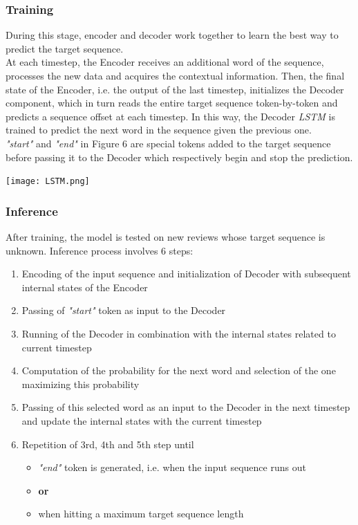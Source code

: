 \documentclass[fleqn,10pt]{SelfArx} %
\begin{document}
\subsubsection{Training}
During this stage, encoder and decoder work together to learn the best way to predict the target sequence.\\ At each timestep, the Encoder receives an additional word of the sequence, processes the new data and acquires the contextual information. Then, the final state of the Encoder, i.e. the output of the last timestep, initializes the Decoder component, which in turn reads the entire target sequence token-by-token and predicts a sequence offset at each timestep. In this way, the Decoder \textit{LSTM} is trained to predict the next word in the sequence given the previous one.\\
\textit{"start"} and \textit{"end"} in Figure 6 are special tokens added to the target sequence before passing it to the Decoder which respectively begin and stop the prediction.\par
{\centering\vspace{10pt}
\texttt{[image: LSTM.png]}
\vspace{10pt}
\par}
\subsubsection{Inference}
After training, the model is tested on new reviews whose target sequence is unknown. Inference process involves 6 steps:
\begin{enumerate}
    \item Encoding of the input sequence and initialization of Decoder with subsequent internal states of the Encoder
    \item Passing of \textit{"start"} token as input to the Decoder
    \item Running of the Decoder in combination with the internal states related to current timestep 
    \item Computation of the probability for the next word and selection of the one maximizing this probability
    \item Passing of this selected word as an input to the Decoder in the next timestep and update the internal states with the current timestep
    \item Repetition of 3rd, 4th and 5th step until
    \begin{itemize}
        \item \textit{"end"} token is generated, i.e. when the input sequence runs out
        \item[] \textbf{or}
        \item when hitting a maximum target sequence length 
    \end{itemize}
\end{enumerate}
\end{document}
